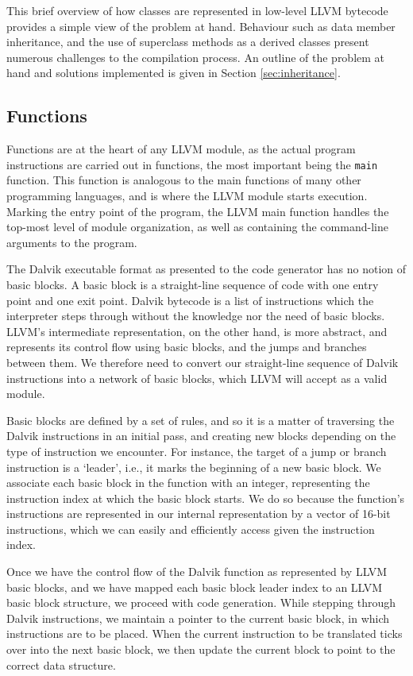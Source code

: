 This brief overview of how classes are represented in low-level LLVM bytecode provides a simple view of the problem at hand. Behaviour such as data member inheritance, and the use of superclass methods as a derived classes present numerous challenges to the compilation process. An outline of the problem at hand and solutions implemented is given in Section \ref{sec:inheritance}.

\subsection*{Functions}

Functions are at the heart of any LLVM module, as the actual program instructions are carried out in functions, the most important being the \verb|main| function. This function is analogous to the main functions of many other programming languages, and is where the LLVM module starts execution. Marking the entry point of the program, the LLVM main function handles the top-most level of module organization, as well as containing the command-line arguments to the program.

The Dalvik executable format as presented to the code generator has no notion of basic blocks. A basic block is a straight-line sequence of code with one entry point and one exit point. Dalvik bytecode is a list of instructions which the interpreter steps through without the knowledge nor the need of basic blocks. LLVM's intermediate representation, on the other hand, is more abstract, and represents its control flow using basic blocks, and the jumps and branches between them. We therefore need to convert our straight-line sequence of Dalvik instructions into a network of basic blocks, which LLVM will accept as a valid module.

Basic blocks are defined by a set of rules, and so it is a matter of traversing the Dalvik instructions in an initial pass, and creating new blocks depending on the type of instruction we encounter. For instance, the target of a jump or branch instruction is a `leader', i.e., it marks the beginning of a new basic block. We associate each basic block in the function with an integer, representing the instruction index at which the basic block starts. We do so because the function's instructions are represented in our internal representation by a vector of 16-bit instructions, which we can easily and efficiently access given the instruction index. 

Once we have the control flow of the Dalvik function as represented by LLVM basic blocks, and we have mapped each basic block leader index to an LLVM basic block structure, we proceed with code generation. While stepping through Dalvik instructions, we maintain a pointer to the current basic block, in which instructions are to be placed. When the current instruction to be translated ticks over into the next basic block, we then update the current block to point to the correct data structure.

